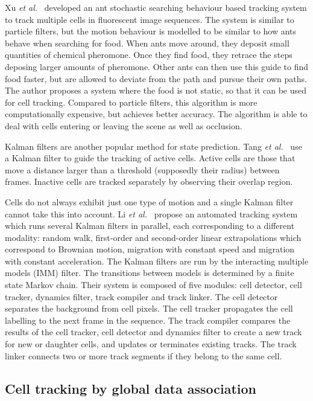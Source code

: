 Xu \emph{et al.}~\cite{xu12} developed an ant stochastic searching behaviour based tracking system to track multiple cells in fluorescent image sequences. The system is similar to particle filters, but the motion behaviour is modelled to be similar to how ants behave when searching for food. When ants move around, they deposit small quantities of chemical pheromone. Once they find food, they retrace the steps deposing larger amounts of pheromone. Other ants can then use this guide to find food faster, but are allowed to deviate from the path and pursue their own paths. The author proposes a system where the food is not static, so that it can be used for cell tracking. Compared to particle filters, this algorithm is more computationally expensive, but achieves better accuracy. The algorithm is able to deal with cells entering or leaving the scene as well as occlusion.

Kalman filters are another popular method for state prediction. Tang \emph{et al.}~\cite{tang} use a Kalman filter to guide the tracking of active cells. Active cells are those that move a distance larger than a threshold (supposedly their radius) between frames. Inactive cells are tracked separately by observing their overlap region.

Cells do not always exhibit just one type of motion and a single Kalman filter cannot take this into account. Li \emph{et al.}~\cite{li07} propose an automated tracking system which runs several Kalman filters in parallel, each corresponding to a different modality: random walk, first-order and second-order linear extrapolations which correspond to Brownian motion, migration with constant speed and migration with constant acceleration. The Kalman filters are run by the interacting multiple models (IMM) filter. The transitions between models is determined by a finite state Markov chain. Their system is composed of five modules: cell detector, cell tracker, dynamics filter, track compiler and track linker. The cell detector separates the background from cell pixels. The cell tracker propagates the cell labelling to the next frame in the sequence. The track compiler compares the results of the cell tracker, cell detector and dynamics filter to create a new track for new or daughter cells, and updates or terminates existing tracks. The track linker connects two or more track segments if they belong to the same cell.

\subsection{Cell tracking by global data association \statusfirstdraft}

